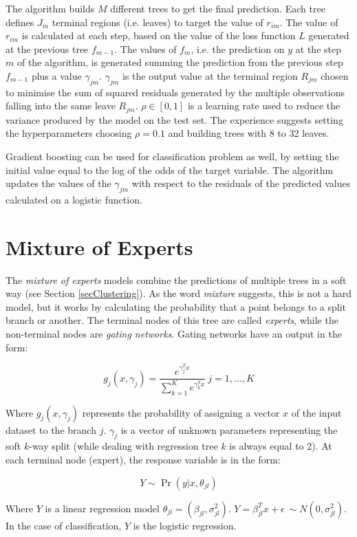 The algorithm builds $M$ different trees to get the final prediction. Each tree defines $J_m$ terminal regions (i.e. leaves) to target the value of $r_{im}$. The value of $r_{im}$ is calculated at each step, based on the value of the loss function $L$ generated at the previous tree $f_{m-1}$. The values of $f_m$, i.e. the prediction on $y$ at the step $m$ of the algorithm, is generated summing the prediction from the previous step $f_{m-1}$ plus a value $\gamma_{jm}$. $\gamma_{jm}$ is the output value at the terminal region $R_{jm}$ chosen to minimise the sum of squared residuals generated by the multiple observations falling into the same leave $R_{jm}$. $\rho\in[0,1]$ is a learning rate used to reduce the variance produced by the model on the test set. The experience suggests setting the hyperparameters choosing $\rho=0.1$ and building trees with 8 to 32 leaves. \par

Gradient boosting can be used for classification problem as well, by setting the initial value equal to the log of the odds of the target variable. The algorithm updates the values of the $\gamma_{jm}$ with respect to the residuals of the predicted values calculated on a logistic function. 


\section{Mixture of Experts}
The \textit{mixture of experts} models combine the predictions of multiple trees in a soft way (see Section \ref{secClustering}). As the word \textit{mixture} suggests, this is not a hard model, but it works by calculating the probability that a point belongs to a split branch or another. The terminal nodes of this tree are called \textit{experts}, while the non-terminal nodes are \textit{gating networks}. Gating networks have an output in the form:

\begin{equation}
g_j\left(x,\gamma_j\right)=\frac{e^{\gamma_j^Tx}}{\sum_{k=1}^{K}e^{\gamma_k^Tx}}\ j=1,\ldots,K
\label{eq_mixtureOfExperts1}
\end{equation}

Where $g_j\left(x,\gamma_j\right)$ represents the probability of assigning a vector $x$ of the input dataset to the branch $j$. $\gamma_j$ is a vector of unknown parameters representing the soft $k$-way split (while dealing with regression tree $k$ is always equal to 2). At each terminal node (expert), the response variable is in the form:

\begin{equation}
Y \sim \Pr(y|x,\theta_{jl})
\label{eq_mixtureOfExperts2}
\end{equation}

Where $Y$ is a linear regression model $\theta_{jl}=(\beta_{jl},\sigma_{jl}^2)$. $Y=\beta_{jl}^Tx+\epsilon\ \sim N(0,\sigma_{jl}^2)$. In the case of classification, $Y$ is the logistic regression. 
